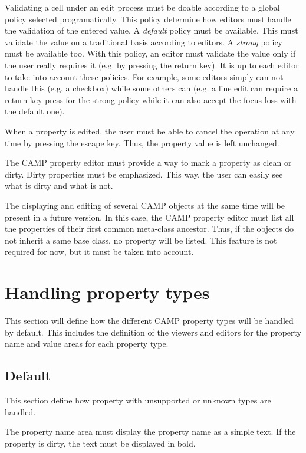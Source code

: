 \documentclass[a4paper, twoside]{report}
\begin{document}
Validating a cell under an edit process must be doable according to a global policy selected
programatically. This policy determine how editors must handle the validation of the entered value.
A \emph{default} policy must be available. This must validate the value on a traditional basis
according to editors. A \emph{strong} policy must be available too. With this policy, an editor
must validate the value only if the user really requires it (e.g. by pressing the return
key). It is up to each editor to take into account these policies. For example, some editors simply
can not handle this (e.g. a checkbox) while some others can (e.g. a line edit can require a return
key press for the strong policy while it can also accept the focus loss with the default one).

When a property is edited, the user must be able to cancel the operation at any time by
pressing the escape key. Thus, the property value is left unchanged.

The CAMP property editor must provide a way to mark a property as clean or dirty. Dirty properties must be
emphasized. This way, the user can easily see what is dirty and what is not.

The displaying and editing of several CAMP objects at the same time will be present in a future
version. In this case, the CAMP property editor must list all the properties of their first common
meta-class ancestor. Thus, if the objects do not inherit a same base class, no property will be
listed. This feature is not required for now, but it must be taken into account.

\chapter{Handling property types\label{sec:property_types}}

This section will define how the different CAMP property types will be handled by default. This
includes the definition of the viewers and editors for the property name and value areas for each
property type.

\section{Default}

This section define how property with unsupported or unknown types are handled.

The property name area must display the property name as a simple text. If the property is dirty, the
text must be displayed in bold.
\end{document}
